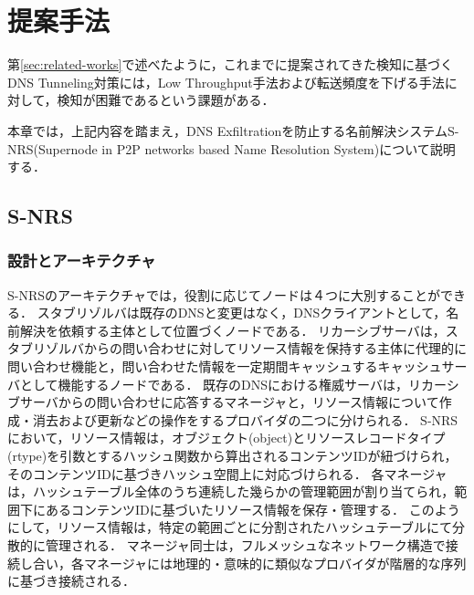 \section{提案手法}
第\ref{sec:related-works}で述べたように，これまでに提案されてきた検知に基づくDNS Tunneling対策には，Low Throughput手法および転送頻度を下げる手法に対して，検知が困難であるという課題がある．

本章では，上記内容を踏まえ，DNS Exfiltrationを防止する名前解決システムS-NRS(Supernode in P2P networks based Name Resolution System)について説明する．

\subsection{S-NRS}
\subsubsection{設計とアーキテクチャ}
S-NRSのアーキテクチャでは，役割に応じてノードは４つに大別することができる．
スタブリゾルバは既存のDNSと変更はなく，DNSクライアントとして，名前解決を依頼する主体として位置づくノードである．
リカーシブサーバは，スタブリゾルバからの問い合わせに対してリソース情報を保持する主体に代理的に問い合わせ機能と，問い合わせた情報を一定期間キャッシュするキャッシュサーバとして機能するノードである．
既存のDNSにおける権威サーバは，リカーシブサーバからの問い合わせに応答するマネージャと，リソース情報について作成・消去および更新などの操作をするプロバイダの二つに分けられる．
S-NRSにおいて，リソース情報は，オブジェクト(object)とリソースレコードタイプ(rtype)を引数とするハッシュ関数から算出されるコンテンツIDが紐づけられ，そのコンテンツIDに基づきハッシュ空間上に対応づけられる．
各マネージャは，ハッシュテーブル全体のうち連続した幾らかの管理範囲が割り当てられ，範囲下にあるコンテンツIDに基づいたリソース情報を保存・管理する．
このようにして，リソース情報は，特定の範囲ごとに分割されたハッシュテーブルにて分散的に管理される．
マネージャ同士は，フルメッシュなネットワーク構造で接続し合い，各マネージャには地理的・意味的に類似なプロバイダが階層的な序列に基づき接続される．

